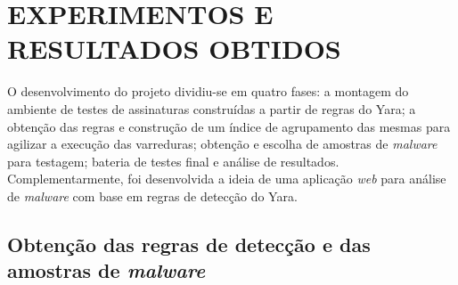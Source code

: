 \chapter{EXPERIMENTOS E RESULTADOS OBTIDOS}
\label{c.Desenvolvimento}

O desenvolvimento do projeto dividiu-se em quatro fases: a montagem do ambiente
de testes de assinaturas construídas a partir de regras do Yara; a obtenção das
regras e construção de um índice de agrupamento das mesmas para agilizar a
execução das varreduras; obtenção e escolha de amostras de \textit{malware} para
testagem; bateria de testes final e análise de resultados. Complementarmente,
foi desenvolvida a ideia de uma aplicação \textit{web} para análise de
\textit{malware} com base em regras de detecção do Yara.

\section{Obtenção das regras de detecção e das amostras de \textit{malware}}
\label{s.obtregras}


